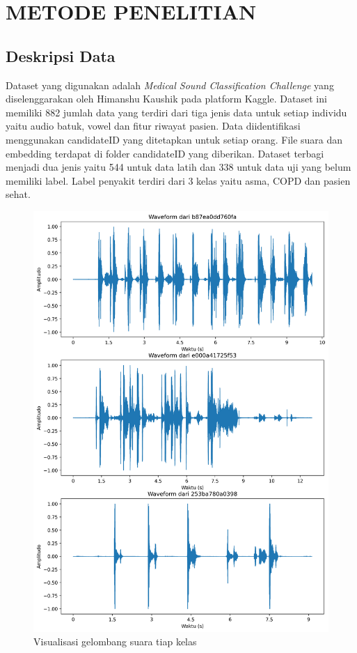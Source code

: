 \chapter{METODE PENELITIAN}

\section{Deskripsi Data}
Dataset yang digunakan adalah \textit{Medical Sound Classification Challenge} yang diselenggarakan oleh Himanshu Kaushik pada platform Kaggle\cite{airs-ai-in-respiratory-sounds}. Dataset ini memiliki 882 jumlah data yang terdiri dari tiga jenis data untuk setiap individu yaitu audio batuk, vowel dan fitur riwayat pasien. Data diidentifikasi menggunakan candidateID yang ditetapkan untuk setiap orang. File suara dan embedding terdapat di folder candidateID yang diberikan. Dataset terbagi menjadi dua jenis yaitu 544 untuk data latih dan 338 untuk data uji yang belum memiliki label. Label penyakit terdiri dari 3 kelas yaitu asma, COPD dan pasien sehat.
\begin{figure}[H]
    \centering
    \includegraphics[width=0.7\linewidth]{gambar/waveforms.png}
    \caption{Visualisasi gelombang suara tiap kelas}
    \label{fig:waveform}
\end{figure}

